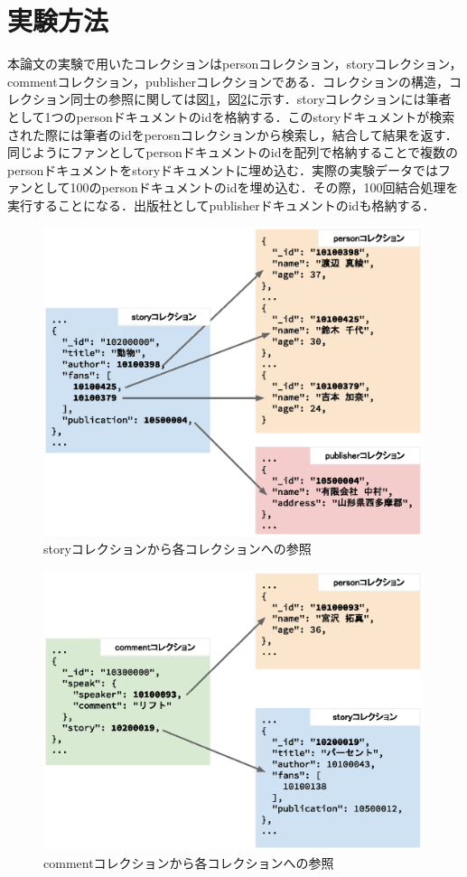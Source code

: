 \documentclass[a4paper,11pt]{ujreport}
\begin{document}
\section{実験方法}
本論文の実験で用いたコレクションはpersonコレクション，storyコレクション，commentコレクション，publisherコレクションである．コレクションの構造，コレクション同士の参照に関しては図\ref{figure:ExperimentCollection}，図\ref{figure:ExperimentCollection2}に示す．storyコレクションには筆者として1つのpersonドキュメントのidを格納する．このstoryドキュメントが検索された際には筆者のidをperosnコレクションから検索し，結合して結果を返す．同じようにファンとしてpersonドキュメントのidを配列で格納することで複数のpersonドキュメントをstoryドキュメントに埋め込む．実際の実験データではファンとして100のpersonドキュメントのidを埋め込む．その際，100回結合処理を実行することになる．出版社としてpublisherドキュメントのidも格納する．
\begin{figure}[htbp]
	\begin{center}
		\includegraphics[width=30em, trim=10em 2em 10em 2em]{src/ExperimentCollection.eps} %
	\end{center}
	\caption{storyコレクションから各コレクションへの参照}
	\label{figure:ExperimentCollection}
\end{figure}
\begin{figure}[htbp]
	\begin{center}
		\includegraphics[width=30em, trim=10em 2em 10em 2em]{src/ExperimentCollection2.eps} %
	\end{center}
	\caption{commentコレクションから各コレクションへの参照}
	\label{figure:ExperimentCollection2}
\end{figure}
\end{document}
